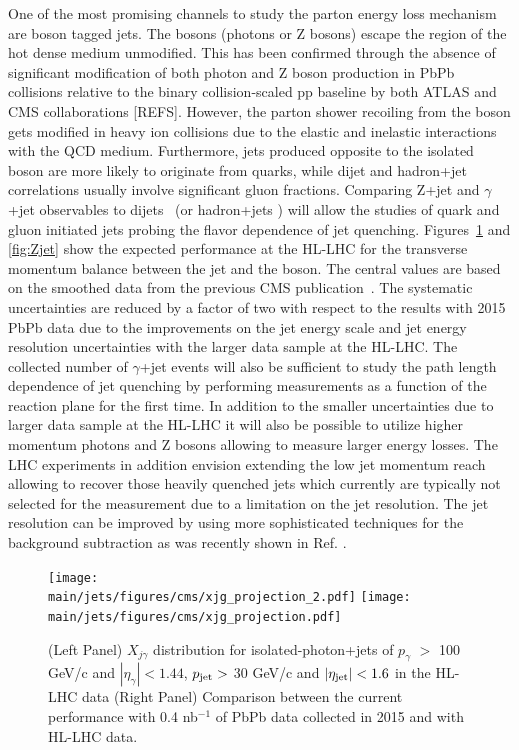 One of the most promising channels to study the parton energy loss mechanism are boson tagged jets. The bosons (photons or Z bosons) escape the region of the hot dense medium unmodified. This has been confirmed through the absence of significant modification of both photon and Z boson production in PbPb collisions relative to the binary collision-scaled pp baseline by both ATLAS and CMS collaborations [REFS]. However, the parton shower recoiling from the boson gets modified in heavy ion collisions due to the elastic and inelastic interactions with the QCD medium. Furthermore, jets produced opposite to the isolated boson
are more likely to originate from quarks, while dijet and hadron+jet correlations usually involve significant gluon fractions. 
Comparing Z+jet and $\gamma$+jet observables to dijets~\cite{Chatrchyan:2011sx,Chatrchyan:2012nia} (or hadron+jets \cite{Adam:2015doa}) will allow the studies of quark and gluon initiated jets probing the flavor dependence of jet quenching. Figures~\ref{fig:photonjet} and \ref{fig:Zjet} show the expected performance at the HL-LHC for the transverse momentum balance between the jet and the boson. The central values are based on the smoothed data from the previous CMS publication~\cite{Sirunyan:2017jic,Sirunyan:2017qhf}. The systematic uncertainties are reduced by a factor of two with respect to the results with 2015 PbPb data due to the improvements on the jet energy scale and jet energy resolution uncertainties with the larger data sample at the HL-LHC. The collected number of $\gamma$+jet events will also be sufficient to study the path length dependence of jet quenching by performing measurements as a function of the reaction plane for the first time. In addition to the smaller uncertainties due to larger data sample at the HL-LHC it will also be possible to utilize higher momentum photons and Z bosons allowing to measure larger energy losses. The LHC experiments in addition envision extending the low jet momentum reach allowing to recover those heavily quenched jets  which currently are typically not selected for the measurement due to a limitation on the jet resolution. The jet resolution can be improved by using more sophisticated techniques for the background subtraction as was recently shown in Ref. \cite{Haake:2018hqn}.

\begin{figure}[!ht]
\begin{center}
\texttt{[image: \\main/jets/figures/cms/xjg\_projection\_2.pdf]}
\texttt{[image: \\main/jets/figures/cms/xjg\_projection.pdf]}
\caption{(Left Panel) $X_{j\gamma}$ distribution for isolated-photon+jets of $p_{\gamma}$ $> $ 100 GeV/c and $|\eta_{\gamma}|<1.44$, $p_{\rm jet} > $ 30 GeV/c and $|\eta_{\rm jet}| < 1.6$ in the HL-LHC data (Right Panel) Comparison between the current performance with 0.4 nb$^{-1}$ of PbPb data collected in 2015 and with HL-LHC data. \cite{CMS-FTR-17-002:2017dec}}
\label{fig:photonjet}
\end{center}
\end{figure}

